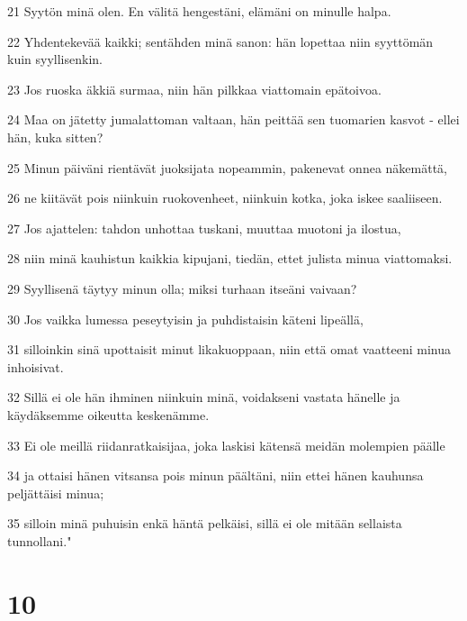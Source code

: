 \par 21 Syytön minä olen. En välitä hengestäni, elämäni on minulle halpa.
\par 22 Yhdentekevää kaikki; sentähden minä sanon: hän lopettaa niin syyttömän kuin syyllisenkin.
\par 23 Jos ruoska äkkiä surmaa, niin hän pilkkaa viattomain epätoivoa.
\par 24 Maa on jätetty jumalattoman valtaan, hän peittää sen tuomarien kasvot - ellei hän, kuka sitten?
\par 25 Minun päiväni rientävät juoksijata nopeammin, pakenevat onnea näkemättä,
\par 26 ne kiitävät pois niinkuin ruokovenheet, niinkuin kotka, joka iskee saaliiseen.
\par 27 Jos ajattelen: tahdon unhottaa tuskani, muuttaa muotoni ja ilostua,
\par 28 niin minä kauhistun kaikkia kipujani, tiedän, ettet julista minua viattomaksi.
\par 29 Syyllisenä täytyy minun olla; miksi turhaan itseäni vaivaan?
\par 30 Jos vaikka lumessa peseytyisin ja puhdistaisin käteni lipeällä,
\par 31 silloinkin sinä upottaisit minut likakuoppaan, niin että omat vaatteeni minua inhoisivat.
\par 32 Sillä ei ole hän ihminen niinkuin minä, voidakseni vastata hänelle ja käydäksemme oikeutta keskenämme.
\par 33 Ei ole meillä riidanratkaisijaa, joka laskisi kätensä meidän molempien päälle
\par 34 ja ottaisi hänen vitsansa pois minun päältäni, niin ettei hänen kauhunsa peljättäisi minua;
\par 35 silloin minä puhuisin enkä häntä pelkäisi, sillä ei ole mitään sellaista tunnollani."

\chapter{10}

